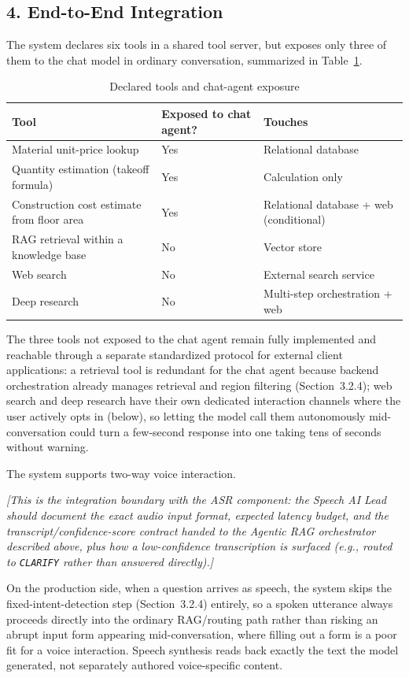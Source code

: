 \documentclass[11pt,a4paper]{article}
\newcommand{\guidance}[1]{%
  {\color{guidanceblue}\itshape [#1]\par}%
}
\begin{document}
\subsection{4. End-to-End Integration}

The system declares six tools in a shared tool server, but exposes only
three of them to the chat model in ordinary conversation, summarized in
Table~\ref{tab:tool-exposure}.

\begin{table}[htbp]
\centering
\caption{Declared tools and chat-agent exposure}
\label{tab:tool-exposure}
\small
\renewcommand{\arraystretch}{1.25}
\begin{tabularx}{\textwidth}{|X|>{\centering\arraybackslash}p{}|X|}
\hline
\rowcolor{tableheader}
\textbf{Tool} & \textbf{Exposed to chat agent?} & \textbf{Touches} \\
\hline
Material unit-price lookup & Yes & Relational database \\
\hline
Quantity estimation (takeoff formula) & Yes & Calculation only \\
\hline
Construction cost estimate from floor area & Yes & Relational database + web
(conditional) \\
\hline
RAG retrieval within a knowledge base & No & Vector store \\
\hline
Web search & No & External search service \\
\hline
Deep research & No & Multi-step orchestration + web \\
\hline
\end{tabularx}
\end{table}
\FloatBarrier

The three tools not exposed to the chat agent remain fully implemented and
reachable through a separate standardized protocol for external client
applications: a retrieval tool is redundant for the chat agent because
backend orchestration already manages retrieval and region filtering
(Section~3.2.4); web search and deep research have their own dedicated
interaction channels where the user actively opts in (below), so letting the
model call them autonomously mid-conversation could turn a
few-second response into one taking tens of seconds without warning.

The system supports two-way voice interaction. \guidance{This is the
integration boundary with the ASR component: the Speech AI Lead should
document the exact audio input format, expected latency budget, and the
transcript/confidence-score contract handed to the Agentic RAG orchestrator
described above, plus how a low-confidence transcription is surfaced (e.g.,
routed to \texttt{CLARIFY} rather than answered directly).} On the
production side, when a question arrives as speech, the system skips the
fixed-intent-detection step (Section~3.2.4) entirely, so a spoken utterance
always proceeds directly into the ordinary RAG/routing path rather than
risking an abrupt input form appearing mid-conversation, where filling out a
form is a poor fit for a voice interaction. Speech synthesis reads back
exactly the text the model generated, not separately authored
voice-specific content.
\end{document}
